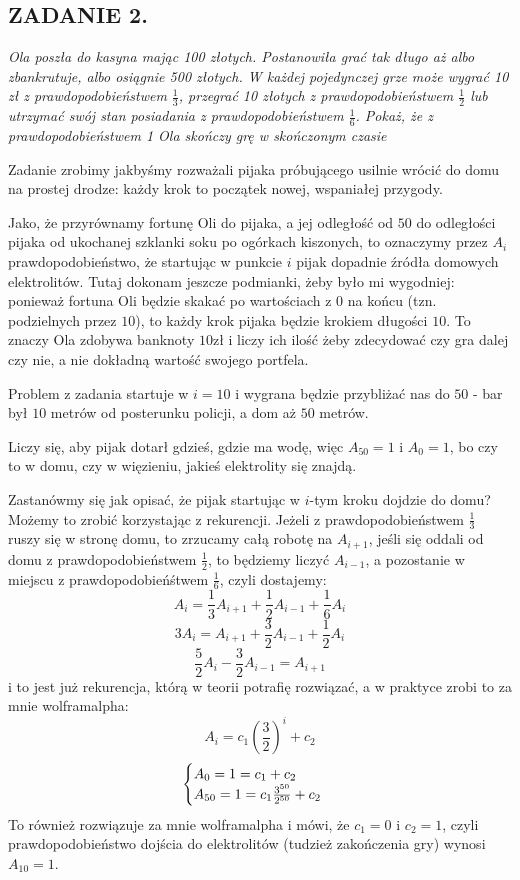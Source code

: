 \documentclass{article}
\begin{document}
\subsection*{ZADANIE 2.}
\emph{\color{pink}Ola poszła do kasyna mając 100 złotych. Postanowiła grać tak długo aż albo zbankrutuje, albo osiągnie 500 złotych. W każdej pojedynczej grze może wygrać 10 zł z prawdopodobieństwem $\frac13$, przegrać 10 złotych z prawdopodobieństwem $\frac12$ lub utrzymać swój stan posiadania z prawdopodobieństwem $\frac16$. Pokaż, że z prawdopodobieństwem 1 Ola skończy grę w skończonym czasie}
\smallskip

Zadanie zrobimy jakbyśmy rozważali pijaka próbującego usilnie wrócić do domu na prostej drodze: każdy krok to początek nowej, wspaniałej przygody.

Jako, że przyrównamy fortunę Oli do pijaka, a jej odległość od $50$ do odległości pijaka od ukochanej szklanki soku po ogórkach kiszonych, to oznaczymy przez $A_i$ prawdopodobieństwo, że startując w punkcie $i$ pijak dopadnie źródła domowych elektrolitów. 
Tutaj dokonam jeszcze podmianki, żeby było mi wygodniej: ponieważ fortuna Oli będzie skakać po wartościach z $0$ na końcu (tzn. podzielnych przez $10$), to każdy krok pijaka będzie krokiem długości $10$. 
To znaczy Ola zdobywa banknoty $10$zł i liczy ich ilość żeby zdecydować czy gra dalej czy nie, a nie dokładną wartość swojego portfela.

Problem z zadania startuje w $i=10$ i wygrana będzie przybliżać nas do $50$ - bar był $10$ metrów od posterunku policji, a dom aż $50$ metrów. 

Liczy się, aby pijak dotarł gdzieś, gdzie ma wodę, więc $A_{50}=1$ i $A_0=1$, bo czy to w domu, czy w więzieniu, jakieś elektrolity się znajdą.
\medskip

Zastanówmy się jak opisać, że pijak startując w $i$-tym kroku dojdzie do domu? 
Możemy to zrobić korzystając z rekurencji. Jeżeli z prawdopodobieństwem $\frac13$ ruszy się w stronę domu, to zrzucamy całą robotę na $A_{i+1}$, jeśli się oddali od domu z prawdopodobieństwem $\frac12$, to będziemy liczyć $A_{i-1}$, a pozostanie w miejscu z prawdopodobieńśtwem $\frac16$, czyli dostajemy:
$$A_i=\frac13A_{i+1}+\frac12A_{i-1}+\frac16A_i$$
$$3A_i=A_{i+1}+\frac32A_{i-1}+\frac12A_i$$
$$\frac52A_i-\frac32A_{i-1}=A_{i+1}$$
i to jest już rekurencja, którą w teorii potrafię rozwiązać, a w praktyce zrobi to za mnie wolframalpha:
$$A_i=c_1\left(\frac32\right)^i+c_2$$
$$\begin{cases}A_0=1=c_1+c_2\\A_{50}=1=c_1{3^{50}\over 2^{50}}+c_2\end{cases}$$
To również rozwiązuje za mnie wolframalpha i mówi, że $c_1=0$ i $c_2=1$, czyli prawdopodobieństwo dojścia do elektrolitów (tudzież zakończenia gry) wynosi $A_{10}=1$.
\end{document}

